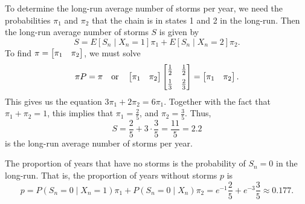\documentclass{homework}
\begin{document}
\begin{alphaparts}
		\questionpart To determine the long-run average number of storms per year, we need the probabilities $\pi_1$ and $\pi_2$ that the chain is in states 1 and 2 in the long-run. Then the long-run average number of storms $S$ is given by
		\begin{equation*}
			S = E[S_n \mid X_n = 1]\pi_1 + E[S_n \mid X_n = 2]\pi_2.
		\end{equation*}
		To find $\pi = \left[\begin{matrix}\pi_1 & \pi_2\end{matrix}\right]$, we must solve
		\begin{equation*}
			\pi P = \pi \quad \text{or} \quad \left[\begin{matrix}\pi_1 & \pi_2\end{matrix}\right]  \left[\begin{matrix}\frac{1}{2} & \frac{1}{2} \\[0.5em] \frac{1}{3} & \frac{2}{3}\end{matrix}\right]= \left[\begin{matrix}\pi_1 & \pi_2\end{matrix}\right].
		\end{equation*}
		This gives us the equation $3\pi_1 + 2\pi_2 = 6\pi_1$. Together with the fact that $\pi_1 + \pi_2 = 1$, this implies that $\pi_1 = \frac{2}{5}$, and $\pi_2 = \frac{3}{5}$. Thus,
		\begin{equation*}
			S = \frac{2}{5} + 3\cdot\frac{3}{5} = \frac{11}{5} = 2.2
		\end{equation*}
		is the long-run average number of storms per year.
		
		\questionpart The proportion of years that have no storms is the probability of $S_n = 0$ in the long-run. That is, the proportion of years without storms $p$ is
		\begin{equation*}
			p = P(S_n = 0 \mid X_n =1)\pi_1 + P(S_n=0 \mid X_n)\pi_2 = e^{-1}\frac{2}{5} + e^{-3}\frac{3}{5} \approx 0.177.
		\end{equation*}
	\end{alphaparts}
	
\end{document}
